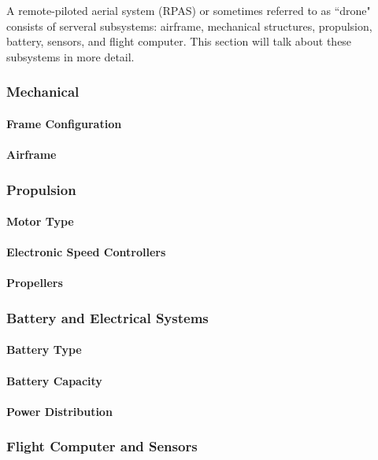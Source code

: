 A remote-piloted aerial system (RPAS) or sometimes referred to as ``drone" consists of serveral subsystems: airframe, mechanical structures, propulsion, battery, sensors, and flight computer. This section will talk about these subsystems in more detail.

\subsubsection{Mechanical}
\paragraph{Frame Configuration}
\paragraph{Airframe}

\subsubsection{Propulsion}
\paragraph{Motor Type}
\paragraph{Electronic Speed Controllers}
\paragraph{Propellers}

\subsubsection{Battery and Electrical Systems}
\paragraph{Battery Type}
\paragraph{Battery Capacity}
\paragraph{Power Distribution}

\subsubsection{Flight Computer and Sensors}
